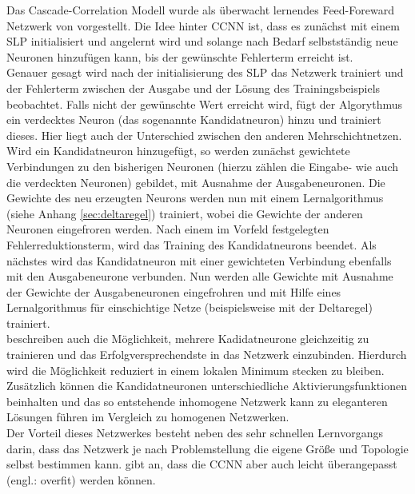 Das Cascade-Correlation Modell wurde als überwacht lernendes Feed-Foreward Netzwerk von \citet{Fahlman1990} vorgestellt. Die Idee hinter \gls{CCNN} ist, dass es zunächst mit einem SLP initialisiert und angelernt wird und solange nach Bedarf selbstständig neue Neuronen hinzufügen kann, bis der gewünschte Fehlerterm erreicht ist.\\
Genauer gesagt wird nach der initialisierung des SLP das Netzwerk trainiert und der Fehlerterm zwischen der Ausgabe und der Lösung des Trainingsbeispiels beobachtet. Falls nicht der gewünschte Wert erreicht wird, fügt der Algorythmus ein verdecktes Neuron (das sogenannte Kandidatneuron) hinzu und trainiert dieses. Hier liegt auch der Unterschied zwischen den anderen Mehrschichtnetzen. Wird ein Kandidatneuron hinzugefügt, so werden zunächst gewichtete Verbindungen zu den bisherigen Neuronen (hierzu zählen die Eingabe- wie auch die verdeckten Neuronen) gebildet, mit Ausnahme der Ausgabeneuronen. Die Gewichte des neu erzeugten Neurons werden nun mit einem Lernalgorithmus (siehe Anhang \ref{sec:deltaregel}) trainiert, wobei die Gewichte der anderen Neuronen eingefroren werden. Nach einem im Vorfeld festgelegten Fehlerreduktionsterm, wird das Training des Kandidatneurons beendet. Als nächstes wird das Kandidatneuron mit einer gewichteten Verbindung ebenfalls mit den Ausgabeneurone verbunden. Nun werden alle Gewichte mit Ausnahme der Gewichte der Ausgabeneuronen eingefrohren und mit Hilfe eines Lernalgorithmus für einschichtige Netze (beispielsweise mit der Deltaregel) trainiert.\\
\citet{Fahlman1990} beschreiben auch die Möglichkeit, mehrere Kadidatneurone gleichzeitig zu trainieren und das Erfolgversprechendste in das Netzwerk einzubinden. Hierdurch wird die Möglichkeit reduziert in einem lokalen Minimum stecken zu bleiben. Zusätzlich können die Kandidatneuronen unterschiedliche Aktivierungsfunktionen beinhalten und das so entstehende inhomogene Netzwerk kann zu eleganteren Lösungen führen im Vergleich zu homogenen Netzwerken.\\
Der Vorteil dieses Netzwerkes besteht neben des sehr schnellen Lernvorgangs darin, dass das Netzwerk je nach Problemstellung die eigene Größe und Topologie selbst bestimmen kann. \citet{Balazs2009} gibt an, dass die CCNN aber auch leicht überangepasst (engl.: overfit) werden können.\\

